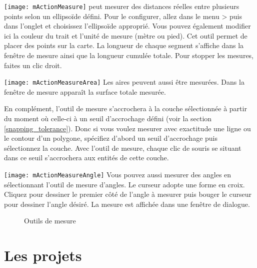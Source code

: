 \texttt{[image: mActionMeasure]} 
\qg peut mesurer des distances réelles entre plusieurs points selon un ellipsoïde défini. Pour le configurer, allez dans le menu  > puis dans l'onglet  et choisissez l'ellipsoïde approprié. Vous pouvez également modifier ici la couleur du trait et l'unité de mesure (mètre ou pied). Cet outil permet de placer des points sur la carte. La longueur de chaque segment s'affiche dans la fenêtre de mesure ainsi que la longueur cumulée totale. Pour stopper les mesures, faites un clic droit. \par
\texttt{[image: mActionMeasureArea]} Les aires peuvent aussi être mesurées.
Dans la fenêtre de mesure apparaît la surface totale mesurée. \par
En complément, l'outil de mesure s'accrochera à la couche sélectionnée à partir du moment où celle-ci à un seuil d'accrochage défini (voir la section \ref{snapping_tolerance}). Donc si vous voulez mesurer avec exactitude une ligne ou le contour d'un polygone, spécifiez d'abord un seuil d'accrochage puis sélectionnez la couche. Avec l'outil de mesure, chaque clic de souris se situant dans ce seuil s'accrochera aux entités de cette couche. \par
\texttt{[image: mActionMeasureAngle]}
Vous pouvez aussi mesurer des angles en sélectionnant l'outil de mesure d'angles. Le curseur adopte une forme en croix. Cliquez pour dessiner le premier côté de l'angle à mesurer puis bouger le curseur pour dessiner l'angle désiré. La mesure est affichée dans une fenêtre de dialogue.

\begin{figure}[ht]
\centering
  \hspace{1cm}
  \caption{Outils de mesure \nixcaption} \label{fig:measure}
\end{figure}

\section{Les projets} \label{sec:projects} 

